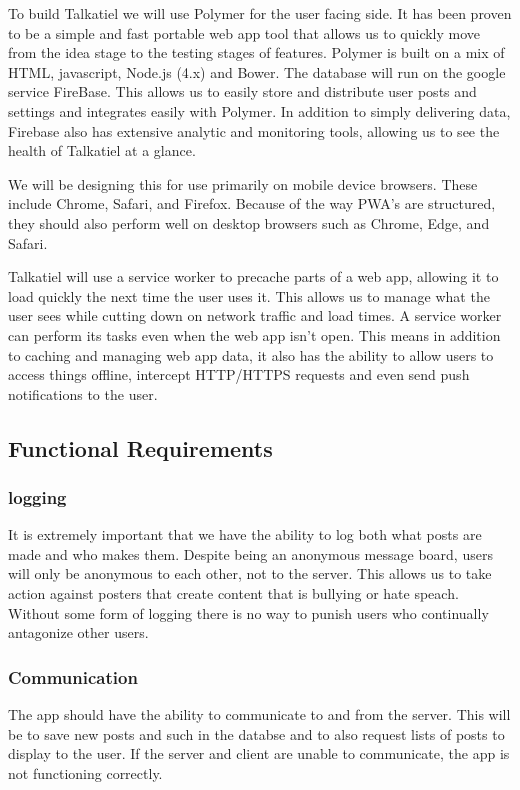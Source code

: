 \documentclass[12pt]{article}
\begin{document}
	To build Talkatiel we will use Polymer for the user facing side.  It has been proven to be a simple and fast portable web app tool that allows us to quickly move from the idea stage to the testing stages of features.  Polymer is built on a mix of HTML, javascript, Node.js (4.x) and Bower.  The database will run on the google service FireBase.  This allows us to easily store and distribute user posts and settings and integrates easily with Polymer.  In addition to simply delivering data, Firebase also has extensive analytic and monitoring tools, allowing us to see the health of Talkatiel at a glance.

	We will be designing this for use primarily on mobile device browsers.  These include Chrome, Safari, and Firefox.  Because of the way PWA’s are structured, they should also perform well on desktop browsers such as Chrome, Edge, and Safari.

  Talkatiel will use a service worker to precache parts of a web app, allowing it to load quickly the next time the user uses it.  This allows us to manage what the user sees while cutting down on network traffic and load times.  A service worker can perform its tasks even when the web app isn’t open.  This means in addition to caching and managing web app data, it also has the ability to allow users to access things offline, intercept HTTP/HTTPS requests and even send push notifications to the user.
  
\subsection{Functional Requirements}
\subsubsection{logging}
It is extremely important that we have the ability to log both what posts are made and who makes them.  Despite being an anonymous message board, users will only be anonymous to each other, not to the server.  This allows us to take action against posters that create content that is bullying or hate speach.  Without some form of logging there is no way to punish users who continually antagonize other users.
\subsubsection{Communication}
The app should have the ability to communicate to and from the server.  This will be to save new posts and such in the databse and to also request lists of posts to display to the user.  If the server and client are unable to communicate, the app is not functioning correctly.
\end{document}
